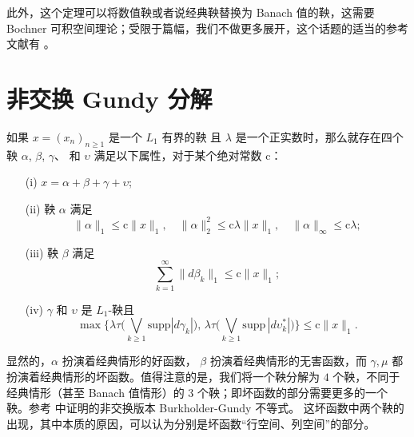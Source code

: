 \begin{remark}
    此外，这个定理可以将数值鞅或者说经典鞅替换为 Banach 值的鞅，这需要 Bochner 可积空间理论；受限于篇幅，我们不做更多展开，这个话题的适当的参考文献有 \cite*{hytonen2016analysis}。
\end{remark}

\section{非交换 Gundy 分解}
\begin{theorem}\label{Gundy:Noncommutative:Main} 如果 $x=(x_n)_{n \ge 1}$ 是一个 $L_1$ 有界的鞅
且 $\lambda$ 是一个正实数时，那么就存在四个鞅 $\alpha$, $\beta$, $\gamma$、
和 $\upsilon$ 满足以下属性，对于某个绝对常数 $\mathrm{c}$：
\begin{itemize}
\item[(i)] $x=\alpha +\beta + \gamma + \upsilon$;
\item[(ii)] 鞅 $\alpha$ 满足 $$\|\alpha\|_1 \leq
\mathrm{c} \|x\|_1, \quad \|\alpha\|_2^2 \leq \mathrm{c}
\lambda\|x\|_1, \quad \|\alpha\|_\infty \leq \mathrm{c} \lambda;$$
\item[(iii)] 鞅 $\beta$ 满足 $$\sum_{k=1}^{\infty}
\|d\beta_k\|_1 \le \mathrm{c} \|x\|_1;$$
\item[(iv)] $\gamma$ 和 $\upsilon$ 是 $L_1$-鞅且
$$\max \Big\{ \lambda \tau \Big( \bigvee_{k \ge 1} \mathrm{supp}
|d\gamma_k| \Big), \, \lambda \tau \Big( \bigvee_{k \ge 1}
\mathrm{supp} \, |d\upsilon_k^*| \Big) \Big\} \le \mathrm{c}
\|x\|_1.$$
\end{itemize}
\end{theorem}
\begin{remark}
    显然的，$\alpha$ 扮演着经典情形的好函数， $\beta$ 扮演着经典情形的无害函数，而 $\gamma,\mu$ 都扮演着经典情形的坏函数。值得注意的是，我们将一个鞅分解为 $4$ 个鞅，不同于经典情形（甚至 Banach 值情形）的 $3$ 个鞅；即坏函数的部分需要更多的一个鞅。参考 \cite{PX1} 中证明的非交换版本 Burkholder-Gundy 不等式。
    这坏函数中两个鞅的出现，其中本质的原因，可以认为分别是坏函数“行空间、列空间”的部分。
\end{remark}


